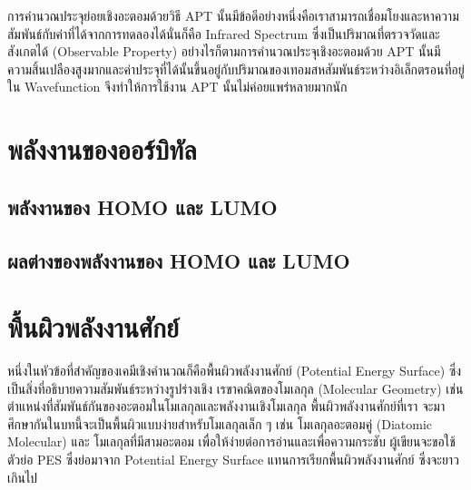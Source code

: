 \begin{enumerate}
    การคำนวณประจุย่อยเชิงอะตอมด้วยวิธี APT นั้นมีข้อดีอย่างหนึ่งคือเราสามารถเชื่อมโยงและหาความสัมพันธ์กับค่าที่ได้จากการทดลองได้นั่นก็คือ 
    Infrared Spectrum ซึ่งเป็นปริมาณที่ตรวจวัดและสังเกตได้ (Observable Property) อย่างไรก็ตามการคำนวณประจุเชิงอะตอมด้วย APT 
    นั้นมีความสิ้นเปลืองสูงมากและค่าประจุที่ได้นั้นขึ้นอยู่กับปริมาณของเทอมสหสัมพันธ์ระหว่างอิเล็กตรอนที่อยู่ใน Wavefunction จึงทำให้การใช้งาน 
    APT นั้นไม่ค่อยแพร่หลายมากนัก

\end{enumerate}

\section{พลังงานของออร์บิทัล}
\label{sec:ener_orb}



\subsection{พลังงานของ HOMO และ LUMO}
\label{ssec:ener_homo_lumo}



\subsection{ผลต่างของพลังงานของ HOMO และ LUMO}
\label{sec:ener_diff_orb}


\section{พื้นผิวพลังงานศักย์}
\label{sec:pes}

หนึ่งในหัวข้อที่สำคัญของเคมีเชิงคำนวณก็คือพื้นผิวพลังงานศักย์ (Potential Energy Surface) ซึ่งเป็นสิ่งที่อธิบายความสัมพันธ์ระหว่างรูปร่างเชิง%
เรขาคณิตของโมเลกุล (Molecular Geometry) เช่น ตำแหน่งที่สัมพันธ์กันของอะตอมในโมเลกุลและพลังงานเชิงโมเลกุล พื้นผิวพลังงานศักย์ที่เรา%
จะมาศึกษากันในบทนี้จะเป็นพื้นผิวแบบง่ายสำหรับโมเลกุลเล็ก ๆ เช่น โมเลกุลอะตอมคู่ (Diatomic Molecular) และ โมเลกุลที่มีสามอะตอม 
เพื่อให้ง่ายต่อการอ่านและเพื่อความกระชับ ผู้เขียนจะขอใช้ตัวย่อ PES ซึ่งย่อมาจาก Potential Energy Surface แทนการเรียกพื้นผิวพลังงานศักย์%
ซึ่งจะยาวเกินไป

